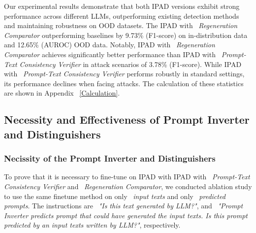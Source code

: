 Our experimental results demonstrate that both IPAD versions exhibit strong performance across different LLMs, outperforming existing detection methods and maintaining robustness on OOD datasets. The IPAD with ~\textit{Regeneration Comparator} outperforming baselines by 9.73\% (F1-score) on in-distribution data and 12.65\% (AUROC) OOD data. Notably, IPAD with ~\textit{Regeneration Comparator} achieves significantly better performance than IPAD with ~\textit{Prompt-Text Consistency Verifier} in attack scenarios of 3.78\% (F1-score). While IPAD with ~\textit{Prompt-Text Consistency Verifier} performs robustly in standard settings, its performance declines when facing attacks. The calculation of these statistics are shown in Appendix ~\ref{Calculation}.
%

\vspace{-0.3cm}
\subsection{Necessity and Effectiveness of \textbf{Prompt Inverter} and \textbf{Distinguishers}}

\subsubsection{Necissity of the \textbf{Prompt Inverter} and \textbf{Distinguishers}}
To prove that it is necessary to fine-tune on IPAD with IPAD with ~\textit{Prompt-Text Consistency Verifier} and ~\textit{Regeneration Comparator}, we conducted ablation study to use the same finetune method on only ~\textit{input texts} and only ~\textit{predicted prompts}. The instructions are ~\textit{"Is this text generated by LLM?"}, and ~\textit{"Prompt Inverter predicts prompt that could have generated the input texts. Is this prompt predicted by an input texts written by LLM?"}, respectively.


